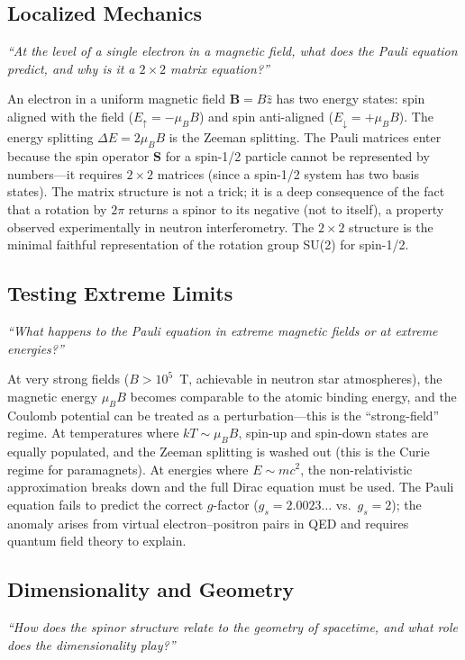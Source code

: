 \subsection*{Localized Mechanics}
\textit{``At the level of a single electron in a magnetic field, what does the Pauli equation predict, and why is it a $2 \times 2$ matrix equation?''}

An electron in a uniform magnetic field $\mathbf{B} = B\hat{z}$ has two energy states: spin aligned with the field ($E_{\uparrow} = -\mu_{B}B$) and spin anti-aligned ($E_{\downarrow} = +\mu_{B}B$). The energy splitting $\Delta E = 2\mu_{B}B$ is the Zeeman splitting. The Pauli matrices enter because the spin operator $\mathbf{S}$ for a spin-1/2 particle cannot be represented by numbers---it requires $2 \times 2$ matrices (since a spin-1/2 system has two basis states). The matrix structure is not a trick; it is a deep consequence of the fact that a rotation by $2\pi$ returns a spinor to its negative (not to itself), a property observed experimentally in neutron interferometry. The $2 \times 2$ structure is the minimal faithful representation of the rotation group SU(2) for spin-1/2.

\subsection*{Testing Extreme Limits}
\textit{``What happens to the Pauli equation in extreme magnetic fields or at extreme energies?''}

At very strong fields ($B > 10^{5}$~T, achievable in neutron star atmospheres), the magnetic energy $\mu_{B}B$ becomes comparable to the atomic binding energy, and the Coulomb potential can be treated as a perturbation---this is the ``strong-field'' regime. At temperatures where $kT \sim \mu_{B}B$, spin-up and spin-down states are equally populated, and the Zeeman splitting is washed out (this is the Curie regime for paramagnets). At energies where $E \sim mc^{2}$, the non-relativistic approximation breaks down and the full Dirac equation must be used. The Pauli equation fails to predict the correct $g$-factor ($g_{s} = 2.0023\ldots$ vs.\ $g_{s} = 2$); the anomaly arises from virtual electron--positron pairs in QED and requires quantum field theory to explain.

\subsection*{Dimensionality and Geometry}
\textit{``How does the spinor structure relate to the geometry of spacetime, and what role does the dimensionality play?''}

